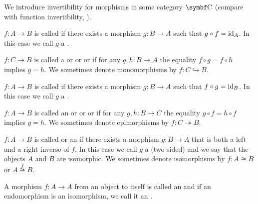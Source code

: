 \begin{definition}\label{def:morphism_invertibility}
  We introduce invertibility for morphisms in some category \( \Cat{C} \) (compare with function invertibility, ).

  \begin{DefEnum}
     \( f: A \to B \) is called  if there exists a morphism \( g: B \to A \) such that \( g \circ f = \operatorname{id}_A \). In this case we call \( g \) a .

     \( f: C \to B \) is called a  or  or  or  if for any \( g, h: B \to A \) the equality \( f \circ g = f \circ h \) implies \( g = h \). We sometimes denote monomorphisms by \( f: C \hookrightarrow B \).

     \( f: A \to B \) is called  if there exists a morphism \( g: B \to A \) such that \( f \circ g = \operatorname{id}_B \). In this case we call \( g \) a .

     \( f: A \to B \) is called an  or  or  or  if for any \( g, h: B \to C \) the equality \( g \circ f = h \circ f \) implies \( g = h \). We sometimes denote epimorphisms by \( f: C \twoheadrightarrow B \).

     \( f: A \to B \) is called  or an  if there exists a morphism \( g: B \to A \) that is both a left and a right inverse of \( f \). In this case we call \( g \) a (two-sided)  and we say that the objects \( A \) and \( B \) are isomorphic. We sometimes denote isomorphisms by \( f: A \cong B \) or \( A \overset f \cong B \).

     A morphism \( f: A \to A \) from an object to itself is called an  and if an endomorphism is an isomorphism, we call it an .
  \end{DefEnum}
\end{definition}

